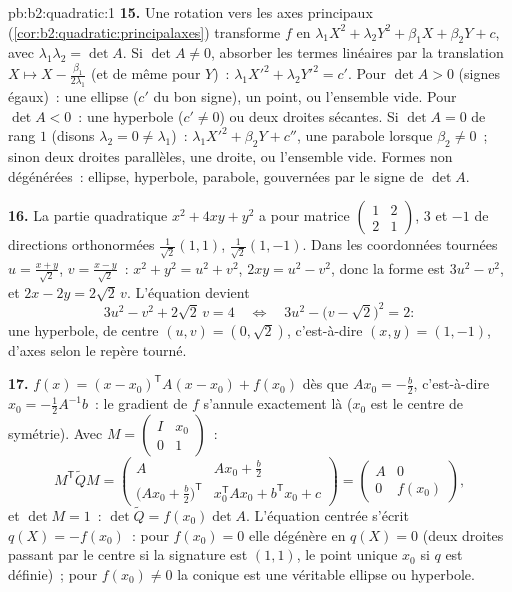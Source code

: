 \begin{solution}{pb:b2:quadratic:1}
\textbf{15.} Une rotation vers les axes principaux
(\cref{cor:b2:quadratic:principalaxes}) transforme $f$ en
$\lambda_1X^2 + \lambda_2Y^2 + \beta_1X + \beta_2Y + c$, avec
$\lambda_1\lambda_2 = \det A$. Si $\det A \neq 0$, absorber les
termes linéaires par la translation $X \mapsto X -
\frac{\beta_1}{2\lambda_1}$ (et de même pour $Y$)~: $\lambda_1X'^2
+ \lambda_2Y'^2 = c'$. Pour $\det A > 0$ (signes égaux)~: une
ellipse ($c'$ du bon signe), un point, ou l'ensemble vide. Pour
$\det A < 0$~: une hyperbole ($c' \neq 0$) ou deux droites
sécantes. Si $\det A = 0$ de rang $1$ (disons $\lambda_2 = 0 \neq
\lambda_1$)~: $\lambda_1X'^2 + \beta_2Y + c''$, une parabole
lorsque $\beta_2 \neq 0$~; sinon deux droites parallèles, une
droite, ou l'ensemble vide. Formes non dégénérées~: ellipse,
hyperbole, parabole, gouvernées par le signe de $\det A$.

\textbf{16.} La partie quadratique $x^2 + 4xy + y^2$ a pour matrice
$\begin{pmatrix}1 & 2\\ 2 & 1\end{pmatrix}$,  $3$
et $-1$ de directions orthonormées $\frac{1}{\sqrt2}(1,1)$,
$\frac{1}{\sqrt2}(1,-1)$. Dans les coordonnées tournées $u =
\frac{x+y}{\sqrt2}$, $v = \frac{x-y}{\sqrt2}$~: $x^2 + y^2 = u^2
+ v^2$, $2xy = u^2 - v^2$, donc la forme est $3u^2 - v^2$, et $2x
- 2y = 2\sqrt2\,v$. L'équation devient
\[
3u^2 - v^2 + 2\sqrt2\,v = 4
\quad\Longleftrightarrow\quad
3u^2 - \bigl(v - \sqrt2\bigr)^2 = 2 :
\]
une hyperbole, de centre $(u, v) = (0, \sqrt2)$, c'est-à-dire $(x,
y) = (1, -1)$, d'axes selon le repère tourné.

\textbf{17.} $f(x) = (x - x_0)^{\mathsf T}A(x - x_0) + f(x_0)$
dès que $Ax_0 = -\frac b2$, c'est-à-dire $x_0 = -\frac12A^{-1}b$~:
le gradient de $f$ s'annule exactement là ($x_0$ est le centre de
symétrie). Avec $M = \begin{pmatrix} I & x_0\\ 0 &
1\end{pmatrix}$~:
\[
M^{\mathsf T}\widetilde QM
= \begin{pmatrix}
A & Ax_0 + \frac b2\\[2pt]
\bigl(Ax_0 + \frac b2\bigr)^{\mathsf T} &
x_0^{\mathsf T}Ax_0 + b^{\mathsf T}x_0 + c
\end{pmatrix}
= \begin{pmatrix} A & 0\\ 0 & f(x_0)\end{pmatrix},
\]
et $\det M = 1$~: $\det\widetilde Q = f(x_0)\det A$. L'équation
centrée s'écrit $q(X) = -f(x_0)$~: pour $f(x_0) = 0$ elle
dégénère en $q(X) = 0$ (deux droites passant par le centre si la
signature est $(1,1)$, le point unique $x_0$ si $q$ est
définie)~; pour $f(x_0) \neq 0$ la conique est une véritable
ellipse ou hyperbole.


\end{solution}
